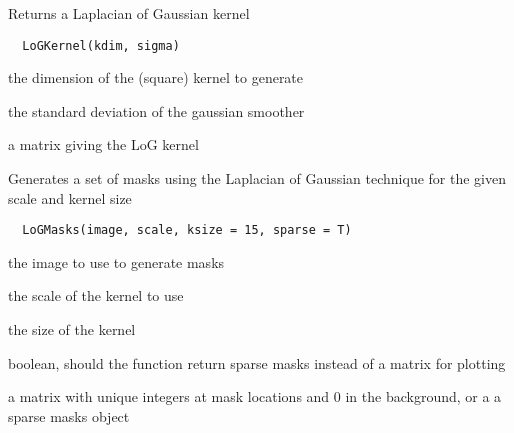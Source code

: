 \documentclass[a4paper]{book}
\begin{document}
%
\begin{Description}\relax
Returns a Laplacian of Gaussian kernel
\end{Description}
%
\begin{Usage}
\begin{verbatim}
  LoGKernel(kdim, sigma)
\end{verbatim}
\end{Usage}
%
\begin{Arguments}
\begin{ldescription}
\item[\code{kdim}] the dimension of the (square) kernel to
generate

\item[\code{sigma}] the standard deviation of the gaussian
smoother
\end{ldescription}
\end{Arguments}
%
\begin{Value}
a matrix giving the LoG kernel
\end{Value}
%
\begin{Description}\relax
Generates a set of masks using the Laplacian of Gaussian
technique for the given scale and kernel size
\end{Description}
%
\begin{Usage}
\begin{verbatim}
  LoGMasks(image, scale, ksize = 15, sparse = T)
\end{verbatim}
\end{Usage}
%
\begin{Arguments}
\begin{ldescription}
\item[\code{image}] the image to use to generate masks

\item[\code{scale}] the scale of the kernel to use

\item[\code{kside}] the size of the kernel

\item[\code{sparse}] boolean, should the function return sparse
masks instead of a matrix for plotting
\end{ldescription}
\end{Arguments}
%
\begin{Value}
a matrix with unique integers at mask locations and 0 in
the background, or a a sparse masks object
\end{Value}
\end{document}
